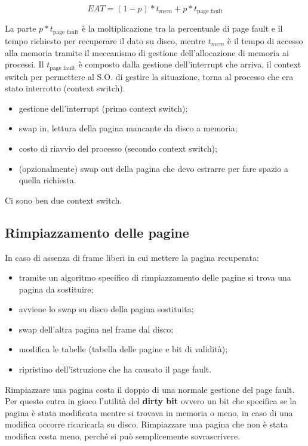 \documentclass[a4paper, 12pt]{book}
\begin{document}
\[
    EAT = (1 - p) * t_{mem} + p * t_{\textrm{page fault}}
\]

La parte $p * t_{\textrm{page fault}}$ è la moltiplicazione tra la percentuale di page fault e il tempo richiesto per recuperare il 
dato su disco, mentre $t_{mem}$ è il tempo di accesso alla memoria tramite il meccanismo di gestione dell'allocazione di 
memoria ai processi. Il $t_{\textrm{page fault}}$ è composto dalla gestione dell'interrupt che arriva, il context switch per 
permettere al S.O. di gestire la situazione, torna al processo che era stato interrotto (context switch).

\begin{itemize}
    \item gestione dell'interrupt (primo context switch);
    \item swap in, lettura della pagina mancante da disco a memoria;
    \item costo di riavvio del processo (secondo context switch);
    \item (opzionalmente) swap out della pagina che devo estrarre per fare spazio a quella richiesta.
\end{itemize}

Ci sono ben due context switch.

\subsection{Rimpiazzamento delle pagine}

In caso di assenza di frame liberi in cui mettere la pagina recuperata:

\begin{itemize}
    \item tramite un algoritmo specifico di rimpiazzamento delle pagine si trova una pagina da sostituire;
    \item avviene lo swap su disco della pagina sostituita;
    \item swap dell'altra pagina nel frame dal disco;
    \item modifica le tabelle (tabella delle pagine e bit di validità);
    \item ripristino dell'istruzione che ha causato il page fault.
\end{itemize}

Rimpiazzare una pagina costa il doppio di una normale gestione del page fault. Per questo entra in gioco l'utilità del \textbf{dirty bit}
ovvero un bit che specifica se la pagina è stata modificata mentre si trovava in memoria o meno, in caso di una modifica occorre
ricaricarla su disco. Rimpiazzare una pagina che non è stata modifica costa meno, perché si può semplicemente sovrascrivere.
\end{document}
